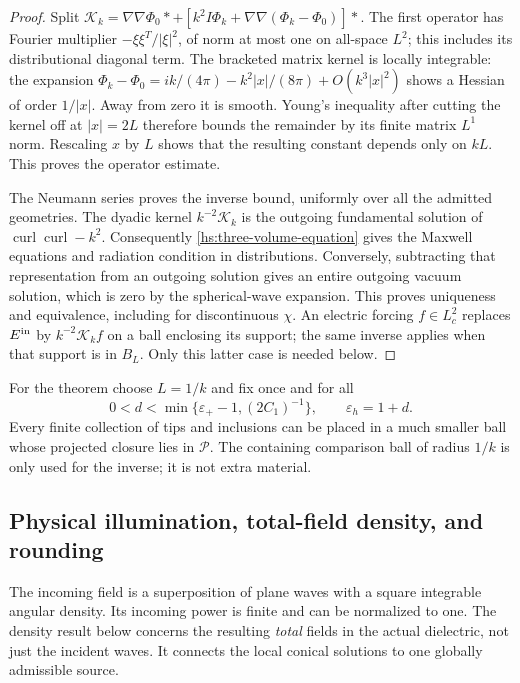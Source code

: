 \begin{proof}
Split
$\mathcal K_k=\nabla\nabla\Phi_0*
 +[k^2I\Phi_k+\nabla\nabla(\Phi_k-\Phi_0)]*$.
The first operator has Fourier multiplier
$-\xi\xi^T/|\xi|^2$, of norm at most one on all-space $L^2$;
this includes its distributional diagonal term.  The bracketed
matrix kernel is locally integrable: the expansion
$\Phi_k-\Phi_0=ik/(4\pi)-k^2|x|/(8\pi)+O(k^3|x|^2)$
shows a Hessian of order $1/|x|$.  Away from zero it is smooth.
Young's inequality after cutting the kernel off at $|x|=2L$
therefore bounds the remainder by its finite matrix $L^1$ norm.
Rescaling $x$ by $L$ shows that the resulting constant depends only
on $kL$.  This proves the operator estimate.

The Neumann series proves the inverse bound, uniformly over all
the admitted geometries.  The dyadic kernel
$k^{-2}\mathcal K_k$ is the outgoing fundamental solution of
$\operatorname{curl}\operatorname{curl}-k^2$.  Consequently
\eqref{hs:three-volume-equation} gives the Maxwell equations and
radiation condition in distributions.  Conversely, subtracting
that representation from an outgoing solution gives an entire
outgoing vacuum solution, which is zero by the spherical-wave
expansion.  This proves uniqueness and equivalence, including for
discontinuous $\chi$.  An electric forcing $f\in L^2_c$ replaces
$E^{\rm in}$ by $k^{-2}\mathcal K_k f$ on a ball enclosing its
support; the same inverse applies when that support is in $B_L$.
Only this latter case is needed below.
\end{proof}

For the theorem choose $L=1/k$ and fix once and for all
\begin{equation}
 0<d<\min\{\varepsilon_+-1,(2C_1)^{-1}\},
 \qquad \varepsilon_h=1+d.
 \label{hs:three-fixed-contrast}
\end{equation}
Every finite collection of tips and inclusions can be placed in a
much smaller ball whose projected closure lies in $\mathcal P$.
The containing comparison ball of radius $1/k$ is only used for
the inverse; it is not extra material.

\subsection{Physical illumination, total-field density, and rounding}
\label{hs:three-global-subsection}

The incoming field is a superposition of plane waves with a square
integrable angular density.  Its incoming power is finite and can be
normalized to one.  The density result below concerns the resulting
\emph{total} fields in the actual dielectric, not just the incident waves.
It connects the local conical solutions to one globally admissible source.

